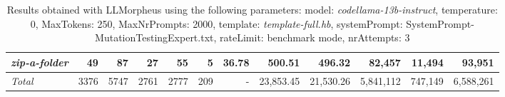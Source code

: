 \begin{table*}
{\begin{tabular}{l||r|r|r|r|r|r||r|r||r|r|r}
   \hline
   \textit{zip-a-folder} & 49 & 87 & 27 & 55 & 5 & 36.78 & 500.51 & 496.32 & 82,457 & 11,494 & 93,951 \\ 
   \hline
   \textit{Total} & 3376 & 5747 & 2761 & 2777 & 209 & - & 23,853.45  & 21,530.26 & 5,841,112 & 747,149 & 6,588,261 \\ 
 \end{tabular}
 }
 \caption{Results obtained with LLMorpheus using the following parameters: 
   model: \textit{codellama-13b-instruct}, 
   temperature: 0, 
   MaxTokens: 250, 
   MaxNrPrompts: 2000, 
   template: \textit{template-full.hb}, 
   systemPrompt: SystemPrompt-MutationTestingExpert.txt, 
   rateLimit: benchmark mode, 
   nrAttempts: 3  
 }
\end{table*}

